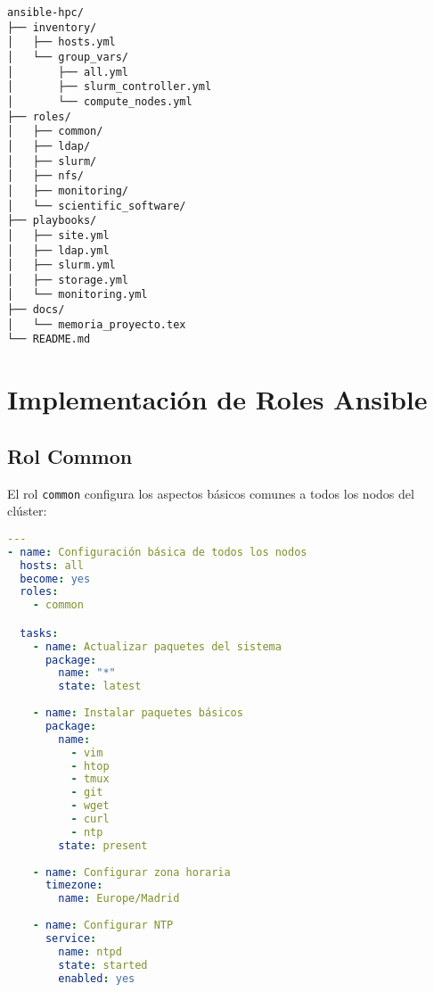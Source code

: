 \documentclass[12pt,a4paper]{report}
\begin{document}
\begin{tcolorbox}[
  enhanced,
  colback=white,
  colframe=cientigo-blue,
  arc=0mm,
  boxrule=1pt,
  title=Estructura del Repositorio,
  attach boxed title to top center={yshift=-\tcboxedtitleheight/2},
  boxed title style={
    colback=cientigo-blue,
    colframe=cientigo-blue,
    fontupper=\bfseries\color{white},
  },
  coltitle=white,
  fonttitle=\bfseries
]
\begin{verbatim}
ansible-hpc/
├── inventory/
│   ├── hosts.yml
│   └── group_vars/
│       ├── all.yml
│       ├── slurm_controller.yml
│       └── compute_nodes.yml
├── roles/
│   ├── common/
│   ├── ldap/
│   ├── slurm/
│   ├── nfs/
│   ├── monitoring/
│   └── scientific_software/
├── playbooks/
│   ├── site.yml
│   ├── ldap.yml
│   ├── slurm.yml
│   ├── storage.yml
│   └── monitoring.yml
├── docs/
│   └── memoria_proyecto.tex
└── README.md
\end{verbatim}
\end{tcolorbox}

\section{Implementación de Roles Ansible}

\subsection{Rol Common}

El rol \texttt{common} configura los aspectos básicos comunes a todos los nodos del clúster:

\begin{lstlisting}[language=yaml]
---
- name: Configuración básica de todos los nodos
  hosts: all
  become: yes
  roles:
    - common

  tasks:
    - name: Actualizar paquetes del sistema
      package:
        name: "*"
        state: latest
      
    - name: Instalar paquetes básicos
      package:
        name:
          - vim
          - htop
          - tmux
          - git
          - wget
          - curl
          - ntp
        state: present
      
    - name: Configurar zona horaria
      timezone:
        name: Europe/Madrid
      
    - name: Configurar NTP
      service:
        name: ntpd
        state: started
        enabled: yes
\end{lstlisting}
\end{document}
